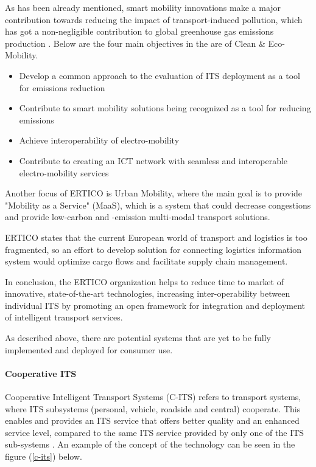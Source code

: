 \documentclass[main.tex]{subfiles}
\begin{document}
As has been already mentioned, smart mobility innovations make a major contribution towards 
reducing the impact of transport-induced pollution, which has got a non-negligible contribution to 
global greenhouse gas emissions production \cite{Ritchie2020}. Below are the four main
objectives in the are of Clean \& Eco-Mobility. 

\begin{itemize}
    \setlength\itemsep{-10pt}
    \item Develop a common approach to the evaluation of ITS deployment as a tool for emissions reduction
    \item Contribute to smart mobility solutions being recognized as a tool for reducing emissions
    \item Achieve interoperability of electro-mobility
    \item Contribute to creating an ICT network with seamless and interoperable electro-mobility services
\end{itemize}

Another focus of ERTICO is Urban Mobility, where the main goal is to provide "Mobility as a Service" (MaaS), 
which is a system that could decrease congestions and provide low-carbon and -emission multi-modal transport 
solutions.  

ERTICO states that the current European world of transport and logistics is too fragmented, so an effort to 
develop solution for connecting logistics information system would optimize cargo flows and facilitate supply 
chain management. 

In conclusion, the ERTICO organization helps to reduce time to market of innovative,
state-of-the-art technologies, increasing inter-operability between individual ITS by promoting
an open framework for integration and deployment of intelligent transport services. 

As described above, there are potential systems that are yet to be fully implemented and
deployed for consumer use. 

\paragraph{Cooperative ITS}

Cooperative Intelligent Transport Systems (C-ITS) refers to transport systems, where ITS 
subsystems (personal, vehicle, roadside and central) cooperate. This
enables and provides an ITS service that offers better quality and an enhanced service level,
compared to the same ITS service provided by only one of the ITS sub-systems \cite{2022}.
An example of the concept of the technology can be seen in the figure (\ref{c-its}) below. 
\end{document}
